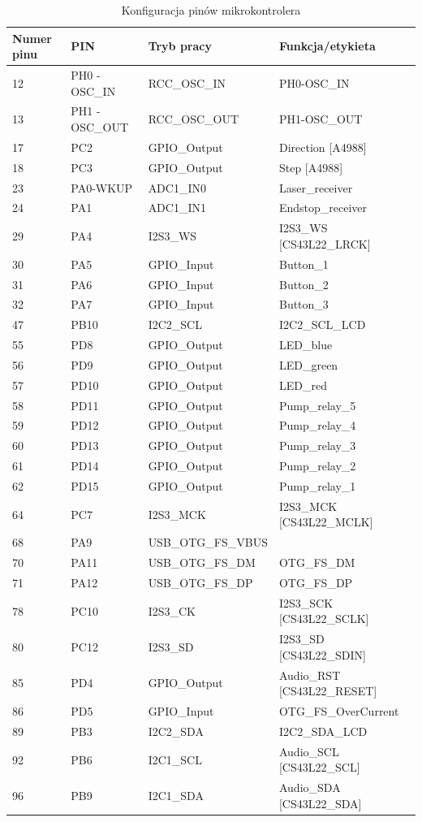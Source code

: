 \documentclass[10pt, a4paper]{article}
\begin{document}
\begin{table}[H]
	\centering
	\begin{tabular}{|l|l|l|l|}
		\hline
		Numer pinu	&	PIN & Tryb pracy & Funkcja/etykieta\\
		\hline
12&	PH0 - OSC{\_}IN&	RCC{\_}OSC{\_}IN&	PH0-OSC{\_}IN \\
13&	PH1 - OSC{\_}OUT&	RCC{\_}OSC{\_}OUT&	PH1-OSC{\_}OUT\\
17&	PC2&	GPIO{\_}Output&	Direction [A4988]\\
18&	PC3&	GPIO{\_}Output&	Step [A4988]\\
23&	PA0-WKUP&	ADC1{\_}IN0&	Laser{\_}receiver\\
24&	PA1&	ADC1{\_}IN1&	Endstop{\_}receiver\\
29&	PA4&	I2S3{\_}WS&	I2S3{\_}WS [CS43L22{\_}LRCK]\\
30&	PA5&	GPIO{\_}Input&	Button{\_}1\\
31&	PA6&	GPIO{\_}Input&	Button{\_}2\\
32&	PA7&	GPIO{\_}Input&	Button{\_}3\\
47&	PB10&	I2C2{\_}SCL&	I2C2{\_}SCL{\_}LCD\\
55&	PD8&	GPIO{\_}Output&	LED{\_}blue\\
56&	PD9&	GPIO{\_}Output&	LED{\_}green\\
57&	PD10&	GPIO{\_}Output&	LED{\_}red\\
58&	PD11&	GPIO{\_}Output&	Pump{\_}relay{\_}5\\
59&	PD12&	GPIO{\_}Output&	Pump{\_}relay{\_}4\\
60&	PD13&	GPIO{\_}Output&	Pump{\_}relay{\_}3\\
61&	PD14&	GPIO{\_}Output&	Pump{\_}relay{\_}2\\
62&	PD15&	GPIO{\_}Output&	Pump{\_}relay{\_}1\\
64&	PC7&	I2S3{\_}MCK&	I2S3{\_}MCK [CS43L22{\_}MCLK]\\
68&	PA9&	USB{\_}OTG{\_}FS{\_}VBUS&	\\
70&	PA11&	USB{\_}OTG{\_}FS{\_}DM&	OTG{\_}FS{\_}DM\\
71&	PA12&	USB{\_}OTG{\_}FS{\_}DP&	OTG{\_}FS{\_}DP\\
78&	PC10&	I2S3{\_}CK&	I2S3{\_}SCK [CS43L22{\_}SCLK]\\
80&	PC12&	I2S3{\_}SD&	I2S3{\_}SD [CS43L22{\_}SDIN]\\
85&	PD4&	GPIO{\_}Output&	Audio{\_}RST [CS43L22{\_}RESET]\\
86&	PD5&	GPIO{\_}Input&	OTG{\_}FS{\_}OverCurrent\\
89&	PB3&	I2C2{\_}SDA&	I2C2{\_}SDA{\_}LCD\\
92&	PB6&	I2C1{\_}SCL&	Audio{\_}SCL [CS43L22{\_}SCL] \\
96&	PB9&	I2C1{\_}SDA&	Audio{\_}SDA [CS43L22{\_}SDA]\\

		\hline
	\end{tabular}
	\caption{Konfiguracja pinów mikrokontrolera}
	
\end{table}
\end{document}
